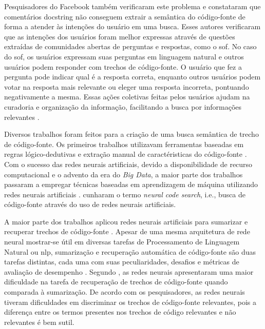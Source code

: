 Pesquisadores do Facebook \citep{cambronero-deep-learning-code-search:2019} também verificaram este problema e constataram que comentários \gls{docstring} não conseguem extrair a semântica do código-fonte de forma a atender às intenções do usuário em uma busca. Esses autores verificaram que as intenções dos usuários foram melhor expressas através de questões extraídas de comunidades abertas de perguntas e respostas, como o \gls{sof}. No caso do \Gls{sof}, os usuários expressam suas perguntas em linguagem natural e outros usuários podem responder com trechos de código-fonte. O usuário que fez a pergunta pode indicar qual é a resposta correta, enquanto outros usuários podem votar na resposta mais relevante ou eleger uma resposta incorreta, pontuando negativamente a mesma. Essas ações coletivas feitas pelos usuários ajudam na curadoria e organização da informação, facilitando a busca por informações relevantes \citep{Wang-quora:2013, cambronero-deep-learning-code-search:2019}. 


Diversos trabalhos foram feitos para a criação de uma busca semântica de trecho de código-fonte. Os primeiros trabalhos utilizavam ferramentas baseadas em regras lógico-dedutivas e extração manual de caractéristicas do código-fonte \citep{Allamanis:2018:SML}. Com o sucesso das redes neurais artificiais, devido a disponibilidade de recurso computacional e o advento da era do \textit{Big Data}, a maior parte dos trabalhos passaram a empregar técnicas baseadas em aprendizagem de máquina utilizando redes neurais artificiais \citep{Gu-deep-code-search:2018, yao-2018, iyer-etal-2016-summarizing, Allamanis-bimodal-source-code-natural-language:2015, Chen-bi-variational-autoencoder:2018, Sachdev-neural-code-search:2018, cambronero-deep-learning-code-search:2019}. \cite{cambronero-deep-learning-code-search:2019} cunharam o termo \textit{neural code search}, i.e., busca de código-fonte através do uso de redes neurais artificiais.

A maior parte dos trabalhos aplicou redes neurais artificiais para sumarizar e recuperar trechos de código-fonte \citep{iyer-etal-2016-summarizing, Allamanis-bimodal-source-code-natural-language:2015, Chen-bi-variational-autoencoder:2018}. Apesar de uma mesma arquitetura de rede neural mostrar-se 
útil em diversas tarefas de Processamento de Linguagem Natural ou \acrfull{nlp}, sumarização e recuperação automática de código-fonte são duas tarefas distintas, cada uma com suas peculiaridades, desafios e métricas de avaliação de desempenho \citep{allahyari-text-summarization-2017}. Segundo \cite{Allamanis-bimodal-source-code-natural-language:2015}, as redes neurais apresentaram uma maior dificuldade na tarefa de recuperação de trechos de código-fonte quando comparada à sumarização. De acordo com os pesquisadores, as redes neurais tiveram dificuldades em discriminar os trechos de código-fonte relevantes, pois a diferença entre os termos presentes nos trechos de código relevantes e não relevantes é bem sutil.

